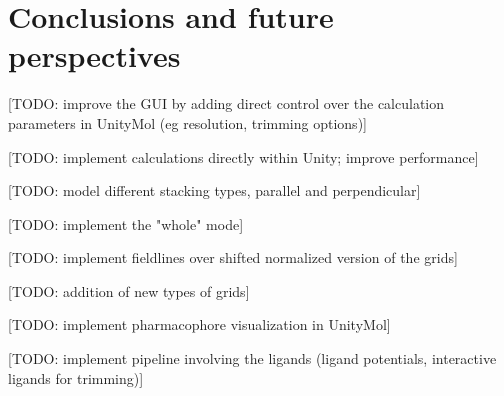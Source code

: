 \chapter{Conclusions and future perspectives} %

[TODO: improve the GUI by adding direct control over the calculation parameters in UnityMol (eg resolution, trimming options)]

[TODO: implement calculations directly within Unity; improve performance]

[TODO: model different stacking types, parallel and perpendicular]

[TODO: implement the "whole" mode]

[TODO: implement fieldlines over shifted normalized version of the grids]

[TODO: addition of new types of grids]

[TODO: implement pharmacophore visualization in UnityMol]

[TODO: implement pipeline involving the ligands (ligand potentials, interactive ligands for trimming)]

